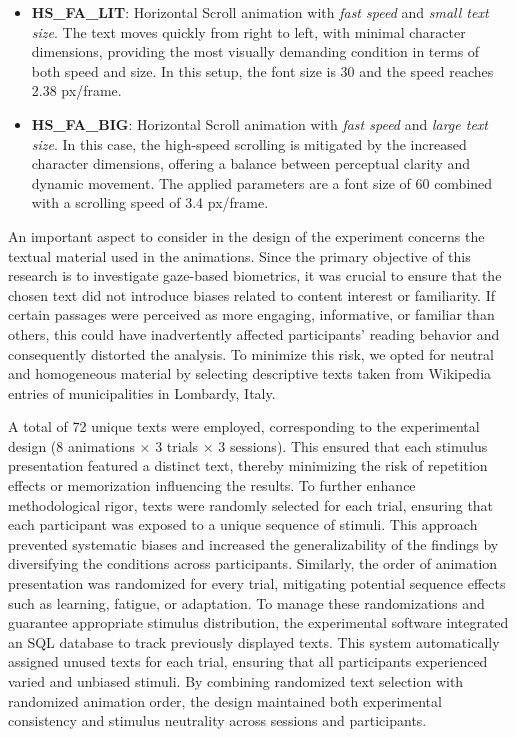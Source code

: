 \documentclass{article}
\begin{document}
\begin{itemize}
    \item \textbf{HS\_FA\_LIT}: Horizontal Scroll animation with \emph{fast speed} and \emph{small text size}. 
    The text moves quickly from right to left, with minimal character dimensions, providing the most visually demanding condition in terms of both speed and size. 
    In this setup, the font size is 30 and the speed reaches 2.38 px/frame. 

    \item \textbf{HS\_FA\_BIG}: Horizontal Scroll animation with \emph{fast speed} and \emph{large text size}. 
    In this case, the high-speed scrolling is mitigated by the increased character dimensions, offering a balance between perceptual clarity and dynamic movement.  
    The applied parameters are a font size of 60 combined with a scrolling speed of 3.4 px/frame.
\end{itemize}

An important aspect to consider in the design of the experiment concerns the textual material used in the animations. 
Since the primary objective of this research is to investigate gaze-based biometrics, it was crucial to ensure that the chosen text did not introduce biases related to content interest or familiarity. 
If certain passages were perceived as more engaging, informative, or familiar than others, this could have inadvertently affected participants' reading behavior and consequently distorted the analysis. 
To minimize this risk, we opted for neutral and homogeneous material by selecting descriptive texts taken from Wikipedia entries of municipalities in Lombardy, Italy.

A total of 72 unique texts were employed, corresponding to the experimental design (8 animations × 3 trials × 3 sessions). 
This ensured that each stimulus presentation featured a distinct text, thereby minimizing the risk of repetition effects or memorization influencing the results.
To further enhance methodological rigor, texts were randomly selected for each trial, ensuring that each participant was exposed to a unique sequence of stimuli. 
This approach prevented systematic biases and increased the generalizability of the findings by diversifying the conditions across participants.
Similarly, the order of animation presentation was randomized for every trial, mitigating potential sequence effects such as learning, fatigue, or adaptation.
To manage these randomizations and guarantee appropriate stimulus distribution, the experimental software integrated an SQL database to track previously displayed texts. 
This system automatically assigned unused texts for each trial, ensuring that all participants experienced varied and unbiased stimuli. 
By combining randomized text selection with randomized animation order, the design maintained both experimental consistency and stimulus neutrality across sessions and participants.
\end{document}
